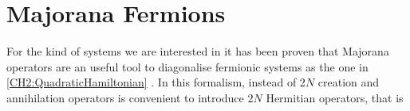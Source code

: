\section{Majorana Fermions}
For the kind of systems we are interested in it has been proven that Majorana operators are an useful tool to diagonalise fermionic systems as the one in \eqref{CH2:QuadraticHamiltonian} \cite{bravyi_lagrangian_2004}. In this formalism, instead of 2$N$ creation and annihilation operators is convenient to introduce $2N$ Hermitian operators, that is

